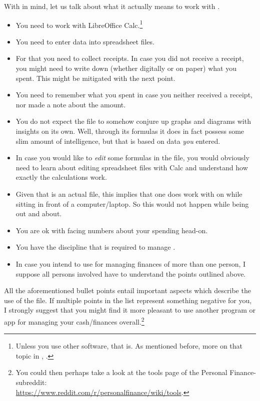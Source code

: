 With  in mind, let us talk about what it actually means to work with \tfn.
\begin{itemize}
	\item You need to work with LibreOffice Calc.\footnote{Unless you use other software, that is.
	As mentioned before, more on that topic in , .}
	\item You need to enter data into spreadsheet files.
	\item For that you need to collect receipts.
	In case you did not receive a receipt, you might need to write down (whether digitally or on paper) what you spent.
	This might be mitigated with the next point.
	\item You need to remember what you spent in case you neither received a receipt, nor made a note about the amount.
	\item You do not expect the file to somehow conjure up graphs and diagrams with insights on its own.
	Well, through its formulas it does in fact possess some slim amount of intelligence, but that is based on data \emph{you} entered.
	\item In case you would like to \emph{edit} some formulas in the file, you would obviously need to learn about editing spreadsheet files with Calc and understand how exactly the calculations work.
	\item Given that \tfn is an actual file, this implies that one does work with on while sitting in front of a computer/laptop.
	So this would not happen while being out and about.
	\item You are ok with facing numbers about your spending head-on.
	\item You have the discipline that is required to manage \tfn.
	\item In case you intend to use \tfn for managing finances of more than one person, I suppose all persons involved have to understand the points outlined above.
\end{itemize}
All the aforementioned bullet points entail important aspects which describe the use of the file.
If multiple points in the list represent something negative for you, I strongly suggest that you might find it more pleasant to use another program or app for managing your cash/finances overall.\footnote{You could then perhaps take a look at the tools page of the Personal Finance-subreddit:\\
\href{https://www.reddit.com/r/personalfinance/wiki/tools}{https://www.reddit.com/r/personalfinance/wiki/tools}.}

